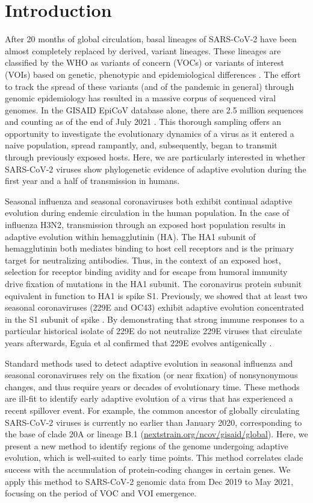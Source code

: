 \documentclass[11pt,oneside,letterpaper]{article}
\begin{document}
\section*{Introduction}
After 20 months of global circulation, basal lineages of SARS-CoV-2 have been almost completely replaced by derived, variant lineages.
These lineages are classified by the WHO as variants of concern (VOCs) or variants of interest (VOIs) based on genetic, phenotypic and epidemiological differences \cite{Konings2021-vm}.
The effort to track the spread of these variants (and of the pandemic in general) through genomic epidemiology has resulted in a massive corpus of sequenced viral genomes.
In the GISAID EpiCoV database alone, there are 2.5 million sequences and counting as of the end of July 2021 \cite{Shu2017-ql}.
This thorough sampling offers an opportunity to investigate the evolutionary dynamics of a virus as it entered a naive population, spread rampantly, and, subsequently, began to transmit through previously exposed hosts.
Here, we are particularly interested in whether SARS-CoV-2 viruses show phylogenetic evidence of adaptive evolution during the first year and a half of transmission in humans.

Seasonal influenza and seasonal coronaviruses both exhibit continual adaptive evolution during endemic circulation in the human population.
In the case of influenza H3N2, transmission through an exposed host population results in adaptive evolution within hemagglutinin (HA).
The HA1 subunit of hemagglutinin both mediates binding to host cell receptors and is the primary target for neutralizing antibodies.
Thus, in the context of an exposed host, selection for receptor binding avidity \cite{Hensley2009-at} and for escape from humoral immunity \cite{Bedford2014-rg} drive fixation of mutations in the HA1 subunit.
The coronavirus protein subunit equivalent in function to HA1 is spike S1.
Previously, we showed that at least two seasonal coronaviruses (229E and OC43) exhibit adaptive evolution concentrated in the S1 subunit of spike \cite{Kistler2021-va}.
By demonstrating that strong immune responses to a particular historical isolate of 229E do not neutralize 229E viruses that circulate years afterwards, Eguia et al confirmed that 229E evolves antigenically \cite{Eguia2021-om}.

Standard methods used to detect adaptive evolution in seasonal influenza and seasonal coronaviruses rely on the fixation (or near fixation) of nonsynonymous changes, and thus require years or decades of evolutionary time.
These methods are ill-fit to identify early adaptive evolution of a virus that has experienced a recent spillover event.
For example, the common ancestor of globally circulating SARS-CoV-2 viruses is currently no earlier than January 2020, corresponding to the base of clade 20A or lineage B.1 (\href{https://nextstrain.org/ncov/gisaid/global}{nextstrain.org/ncov/gisaid/global}).
Here, we present a new method to identify regions of the genome undergoing adaptive evolution, which is well-suited to early time points.
This method correlates clade success with the accumulation of protein-coding changes in certain genes.
We apply this method to SARS-CoV-2 genomic data from Dec 2019 to May 2021, focusing on the period of VOC and VOI emergence.
\end{document}
